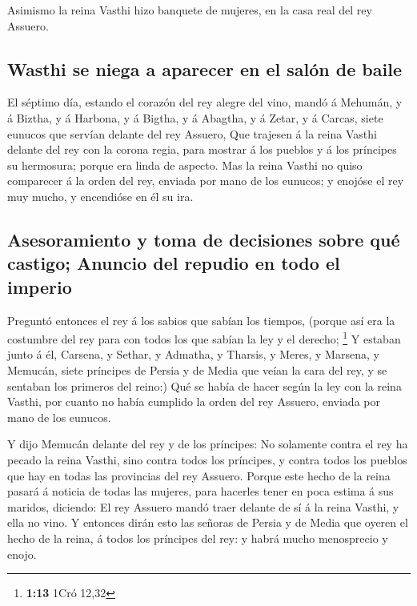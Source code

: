  Asimismo la reina Vasthi hizo banquete de mujeres, en la
casa real del rey Assuero.

\hypertarget{wasthi-se-niega-a-aparecer-en-el-saluxf3n-de-baile}{%
\subsection{Wasthi se niega a aparecer en el salón de
baile}\label{wasthi-se-niega-a-aparecer-en-el-saluxf3n-de-baile}}

 El séptimo día, estando el corazón del rey alegre del
vino, mandó á Mehumán, y á Biztha, y á Harbona, y á Bigtha, y á Abagtha,
y á Zetar, y á Carcas, siete eunucos que servían delante del rey
Assuero,  Que trajesen á la reina Vasthi delante del rey
con la corona regia, para mostrar á los pueblos y á los príncipes su
hermosura; porque era linda de aspecto.  Mas la reina
Vasthi no quiso comparecer á la orden del rey, enviada por mano de los
eunucos; y enojóse el rey muy mucho, y encendióse en él su ira.

\hypertarget{asesoramiento-y-toma-de-decisiones-sobre-quuxe9-castigo-anuncio-del-repudio-en-todo-el-imperio}{%
\subsection{Asesoramiento y toma de decisiones sobre qué castigo;
Anuncio del repudio en todo el
imperio}\label{asesoramiento-y-toma-de-decisiones-sobre-quuxe9-castigo-anuncio-del-repudio-en-todo-el-imperio}}

 Preguntó entonces el rey á los sabios que sabían los
tiempos, (porque así era la costumbre del rey para con todos los que
sabían la ley y el derecho; \footnote{\textbf{1:13} 1Cró 12,32}
 Y estaban junto á él, Carsena, y Sethar, y Admatha, y
Tharsis, y Meres, y Marsena, y Memucán, siete príncipes de Persia y de
Media que veían la cara del rey, y se sentaban los primeros del reino:)
 Qué se había de hacer según la ley con la reina Vasthi,
por cuanto no había cumplido la orden del rey Assuero, enviada por mano
de los eunucos.

 Y dijo Memucán delante del rey y de los príncipes: No
solamente contra el rey ha pecado la reina Vasthi, sino contra todos los
príncipes, y contra todos los pueblos que hay en todas las provincias
del rey Assuero.  Porque este hecho de la reina pasará á
noticia de todas las mujeres, para hacerles tener en poca estima á sus
maridos, diciendo: El rey Assuero mandó traer delante de sí á la reina
Vasthi, y ella no vino.  Y entonces dirán esto las
señoras de Persia y de Media que oyeren el hecho de la reina, á todos
los príncipes del rey: y habrá mucho menosprecio y enojo.

